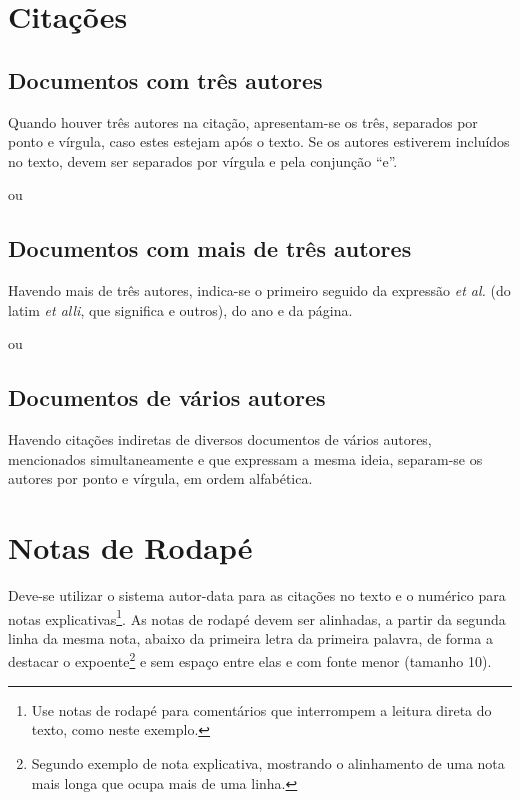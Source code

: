 \section{Citações}

\subsection{Documentos com três autores}

Quando houver três autores na citação, apresentam-se os três, separados por ponto e vírgula, caso estes estejam após o texto. Se os autores estiverem incluídos no texto, devem ser separados por vírgula e pela conjunção ``e''.

 ou 

\cite{tresautores}

\subsection{Documentos com mais de três autores}
Havendo mais de três autores, indica-se o primeiro seguido da expressão \textit{et al.} (do latim \textit{et alli}, que significa e outros), do ano e da página.

 ou 

\cite{quatroautores}

\subsection{Documentos de vários autores}

Havendo citações indiretas de diversos documentos de vários autores, mencionados simultaneamente e que expressam a mesma ideia, separam-se os autores por ponto e vírgula, em ordem alfabética.

\cite{tresautores, quatroautores}

\section{Notas de Rodap\'{e}}

Deve-se utilizar o sistema autor-data para as citações no texto e o numérico para notas explicativas\footnote{Use notas de rodapé para comentários que interrompem a leitura direta do texto, como neste exemplo.}. As notas de rodapé devem ser alinhadas, a partir da segunda linha da mesma nota, abaixo da primeira letra da primeira palavra, de forma a destacar o expoente\footnote{Segundo exemplo de nota explicativa, mostrando o alinhamento de uma nota mais longa que ocupa mais de uma linha.} e sem espaço entre elas e com fonte menor (tamanho 10).
